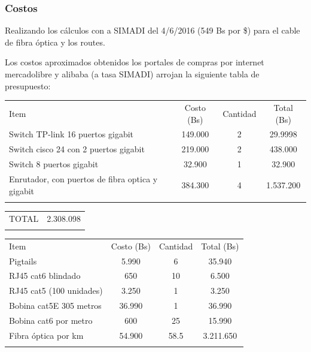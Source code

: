 \documentclass[]{article}
\begin{document}
\subsubsection{Costos}\label{costos}

Realizando los cálculos con a SIMADI del 4/6/2016 (549 Bs por \$) para
el cable de fibra óptica y los routes.

Los costos aproximados obtenidos los portales de compras por internet
mercadolibre y alibaba (a tasa SIMADI) arrojan la siguiente tabla de
presupuesto:

\begin{longtable}[c]{@{}lccc@{}}
\toprule\addlinespace
Item & Costo (Bs) & Cantidad & Total (Bs)
\\\addlinespace
\midrule\endhead
Switch TP-link 16 puertos gigabit & 149.000 & 2 & 29.9998
\\\addlinespace
Switch cisco 24 con 2 puertos gigabit & 219.000 & 2 & 438.000
\\\addlinespace
Switch 8 puertos gigabit & 32.900 & 1 & 32.900
\\\addlinespace
Enrutador, con puertos de fibra optica y gigabit & 384.300 & 4 &
1.537.200
\\\addlinespace
\bottomrule
\end{longtable}

\begin{longtable}[c]{@{}ll@{}}
\toprule\addlinespace
\begin{minipage}[t]{0.18\columnwidth}\raggedright
TOTAL
\end{minipage} & \begin{minipage}[t]{0.21\columnwidth}\raggedright
2.308.098
\end{minipage}
\\\addlinespace
\bottomrule
\end{longtable}

\begin{longtable}[c]{@{}lccc@{}}
\toprule\addlinespace
Item & Costo (Bs) & Cantidad & Total (Bs)
\\\addlinespace
\midrule\endhead
Pigtails & 5.990 & 6 & 35.940
\\\addlinespace
RJ45 cat6 blindado & 650 & 10 & 6.500
\\\addlinespace
RJ45 cat5 (100 unidades) & 3.250 & 1 & 3.250
\\\addlinespace
Bobina cat5E 305 metros & 36.990 & 1 & 36.990
\\\addlinespace
Bobina cat6 por metro & 600 & 25 & 15.990
\\\addlinespace
Fibra óptica por km & 54.900 & 58.5 & 3.211.650
\\\addlinespace
\bottomrule
\end{longtable}
\end{document}
